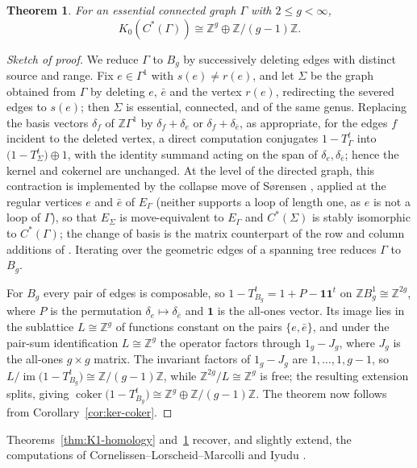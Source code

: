 \documentclass[12pt,reqno]{amsart}
\theoremstyle{plain}
\newtheorem{theorem}{Theorem}[section]
\theoremstyle{definition}
\newcommand{\Z}{\mathbb{Z}}
\newcommand{\coker}{\operatorname{coker}}
\begin{document}
\begin{theorem}\label{thm:K0-torsion}
For an essential connected graph $\Gamma$ with $2\le g<\infty$,
\[
K_0(C^*(\Gamma))\cong\Z^{g}\oplus\Z/(g-1)\Z .
\]
\end{theorem}

\begin{proof}[Sketch of proof]
We reduce $\Gamma$ to $B_g$ by successively deleting edges with distinct source and range. Fix
$e\in\Gamma^1$ with $s(e)\neq r(e)$, and let $\Sigma$ be the graph obtained from $\Gamma$ by
deleting $e$, $\bar e$ and the vertex $r(e)$, redirecting the severed edges to $s(e)$; then
$\Sigma$ is essential, connected, and of the same genus. Replacing the basis vectors $\delta_f$ of
$\Z\Gamma^1$ by $\delta_f+\delta_e$ or $\delta_f+\delta_{\bar e}$, as appropriate, for the edges
$f$ incident to the deleted vertex, a direct computation conjugates $1-T_\Gamma^{t}$ into
$\big(1-T_\Sigma^{t}\big)\oplus 1$, with the identity summand acting on the span of
$\delta_e,\delta_{\bar e}$; hence the kernel and cokernel are unchanged. At the level of the
directed graph, this contraction is implemented by the collapse move of S\o rensen
\cite[Theorem~5.2]{Sorensen}, applied at the regular vertices $e$ and $\bar e$ of $E_\Gamma$
\textup(neither supports a loop of length one, as $e$ is not a loop of $\Gamma$\textup), so that
$E_{\Sigma}$ is move-equivalent to $E_\Gamma$ and $C^*(\Sigma)$ is stably isomorphic to
$C^*(\Gamma)$; the change of basis is the matrix counterpart of the row and column additions of
\cite[Lemmas~7.1 and~7.2]{Sorensen}. Iterating over the
geometric edges of a spanning tree reduces $\Gamma$ to $B_g$.

For $B_g$ every pair of edges is composable, so
$1-T_{B_g}^{t}=1+P-\mathbf{1}\mathbf{1}^{t}$ on $\Z B_g^1\cong\Z^{2g}$, where $P$ is the
permutation $\delta_e\mapsto\delta_{\bar e}$ and $\mathbf{1}$ is the all-ones vector. Its image
lies in the sublattice $L\cong\Z^g$ of functions constant on the pairs $\{e,\bar e\}$, and under
the pair-sum identification $L\cong\Z^g$ the operator factors through $1_g-J_g$, where $J_g$ is
the all-ones $g\times g$ matrix. The invariant factors of $1_g-J_g$ are
$1,\dots,1,g-1$, so $L/\operatorname{im}\big(1-T_{B_g}^{t}\big)\cong\Z/(g-1)\Z$, while
$\Z^{2g}/L\cong\Z^{g}$ is free; the resulting extension splits, giving
$\coker\big(1-T_{B_g}^{t}\big)\cong\Z^{g}\oplus\Z/(g-1)\Z$. The theorem now follows from
Corollary~\ref{cor:ker-coker}.
\end{proof}

Theorems~\ref{thm:K1-homology} and~\ref{thm:K0-torsion} recover, and slightly extend, the
computations of Cornelissen--Lorscheid--Marcolli \cite{CLM} and Iyudu \cite{Iyudu}.
\end{document}

